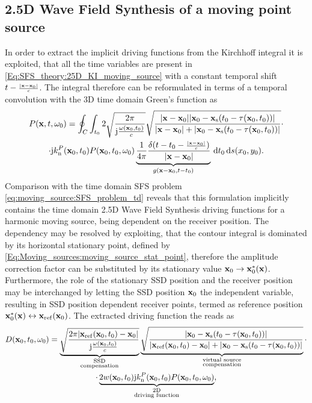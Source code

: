 \subsection{2.5D Wave Field Synthesis of a moving point source}

In order to extract the implicit driving functions from the Kirchhoff integral it is exploited, that all the time variables are present in \eqref{Eq:SFS_theory:25D_KI_moving_source} with a constant temporal shift $t-{\scriptstyle \frac{|\mathbf{x}-\mathbf{x}_0|}{c} }$.
The integral therefore can be reformulated in terms of a temporal convolution with the 3D time domain Green's function as
\begin{multline}
P(\mathbf{x},t,\omega_0) =
\small
\oint_{C}  \int_{t_0} 2 
\sqrt{\frac{2\pi}{\mathrm{j}\frac{\omega(\mathbf{x}_0,t_0)}{c}}}
\sqrt{\frac{|\mathbf{x}-\mathbf{x}_0||\mathbf{x}_0 - \mathbf{x}_{\mathrm{s}}(t_0-\tau(\mathbf{x}_0,t_0))|}{|\mathbf{x}-\mathbf{x}_0|+|\mathbf{x}_0 - \mathbf{x}_{\mathrm{s}}(t_0-\tau(\mathbf{x}_0,t_0))|}} \cdot \\ \cdot
 \mathrm{j} k_{\mathrm{n}}^P(\mathbf{x}_0,t_0) P(\mathbf{x}_0,t_0,\omega_0)
\underbrace{\frac{1}{4\pi} \frac{ \delta(t-t_0- {\scriptstyle \frac{|\mathbf{x}-\mathbf{x}_0|}{c} }) }{|\mathbf{x}-\mathbf{x}_0|}}_{g(\mathbf{x}-\mathbf{x}_0,t-t_0)}
\, \mathrm{d} t_0 \, \mathrm{d} s(x_0, y_0).
\label{Eq:SFS_theory:25D_KI_moving_source_2}
\end{multline}
Comparison with the time domain SFS problem \eqref{eq:moving_source:SFS_problem_td} reveals that this formulation implicitly contains the time domain 2.5D Wave Field Synthesis driving functions for a harmonic moving source, being dependent on the receiver position.
The dependency may be resolved by exploiting, that the contour integral is dominated by its horizontal stationary point, defined by \eqref{Eq:Moving_sources:moving_source_stat_point}, therefore the amplitude correction factor can be substituted by its stationary value $\mathbf{x}_0 \rightarrow \mathbf{x}_0^*(\mathbf{x})$.
Furthermore, the role of the stationary SSD position and the receiver position may be interchanged by letting the SSD position $\mathbf{x}_0$ the independent variable, resulting in SSD position dependent receiver points, termed as reference position $\mathbf{x}_0^*(\mathbf{x}) \leftrightarrow \mathbf{x}_{\mathrm{ref}}(\mathbf{x}_0)$.
The extracted driving function the reads as
\begin{multline}
D(\mathbf{x}_0,t_0,\omega_0) =
\underbrace{ \sqrt{\frac{2\pi |\mathbf{x}_{\mathrm{ref}}(\mathbf{x}_0,t_0)-\mathbf{x}_0|}{\mathrm{j}\frac{\omega(\mathbf{x}_0,t_0)}{c}}}}_{{\substack{\text{SSD}\\\text{compensation}}}}
\underbrace{\sqrt{\frac{|\mathbf{x}_0 - \mathbf{x}_{\mathrm{s}}(t_0-\tau(\mathbf{x}_0,t_0))|}{|\mathbf{x}_{\mathrm{ref}}(\mathbf{x}_0,t_0)-\mathbf{x}_0|+|\mathbf{x}_0 - \mathbf{x}_{\mathrm{s}}(t_0-\tau(\mathbf{x}_0,t_0))|}}}_{{\substack{\text{virtual source}\\\text{compensation}}}} 
\cdot \\ \cdot
\underbrace{2 w(\mathbf{x}_0,t_0) \mathrm{j} k_{\mathrm{n}}^P(\mathbf{x}_0,t_0) P(\mathbf{x}_0,t_0,\omega_0)}_{\substack{\text{2D}\\\text{driving function}}},
\label{Eq:SFS_theory:25D_KI_moving_source}
\end{multline}
